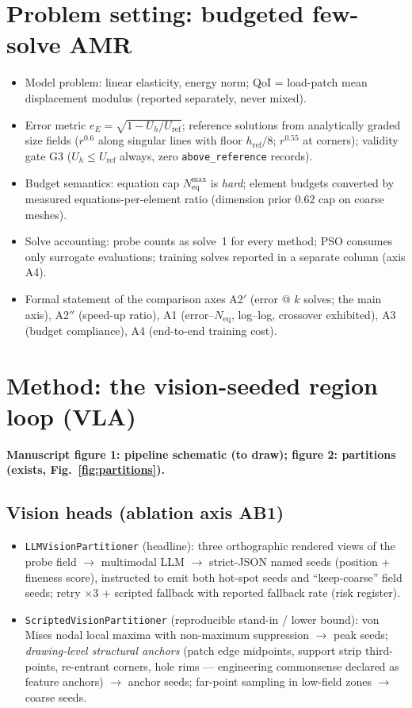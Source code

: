 \documentclass[preprint,12pt]{elsarticle}
\newcommand{\Neq}{N_{\mathrm{eq}}}
\newcommand{\eE}{e_{E}}
\newenvironment{plan}{\begin{itemize}\setlength\itemsep{0.15em}}{\end{itemize}}
\begin{document}
\section{Problem setting: budgeted few-solve AMR}\label{sec:setting}
\begin{plan}
  \item Model problem: linear elasticity, energy norm; QoI = load-patch mean
        displacement modulus (reported separately, never mixed).
  \item Error metric $\eE=\sqrt{1-U_h/U_{\mathrm{ref}}}$; reference solutions from
        analytically graded size fields ($r^{0.6}$ along singular lines with floor
        $h_{\mathrm{ref}}/8$; $r^{0.55}$ at corners); validity gate G3
        ($U_h \le U_{\mathrm{ref}}$ always, zero \texttt{above\_reference} records).
  \item Budget semantics: equation cap $\Neq^{\max}$ is \emph{hard}; element budgets
        converted by measured equations-per-element ratio (dimension prior 0.62 cap on
        coarse meshes).
  \item Solve accounting: probe counts as solve~1 for every method; PSO consumes only
        surrogate evaluations; training solves reported in a separate column (axis A4).
  \item Formal statement of the comparison axes A2$'$ (error @ $k$ solves; the main
        axis), A2$''$ (speed-up ratio), A1 (error--$\Neq$, log--log, crossover
        exhibited), A3 (budget compliance), A4 (end-to-end training cost).
\end{plan}

\section{Method: the vision-seeded region loop (VLA)}\label{sec:method}
\textbf{Manuscript figure 1: pipeline schematic (to draw); figure 2: partitions
(exists, Fig.~\ref{fig:partitions}).}

\subsection{Vision heads (ablation axis AB1)}
\begin{plan}
  \item \texttt{LLMVisionPartitioner} (headline): three orthographic rendered views of
        the probe field $\rightarrow$ multimodal LLM $\rightarrow$ strict-JSON named
        seeds (position + fineness score), instructed to emit both hot-spot seeds and
        ``keep-coarse'' field seeds; retry $\times$3 + scripted fallback with reported
        fallback rate (risk register).
  \item \texttt{ScriptedVisionPartitioner} (reproducible stand-in / lower bound):
        von Mises nodal local maxima with non-maximum suppression $\rightarrow$ peak
        seeds; \emph{drawing-level structural anchors} (patch edge midpoints, support
        strip third-points, re-entrant corners, hole rims --- engineering commonsense
        declared as feature anchors) $\rightarrow$ anchor seeds; far-point sampling in
        low-field zones $\rightarrow$ coarse seeds.
\end{plan}
\end{document}
